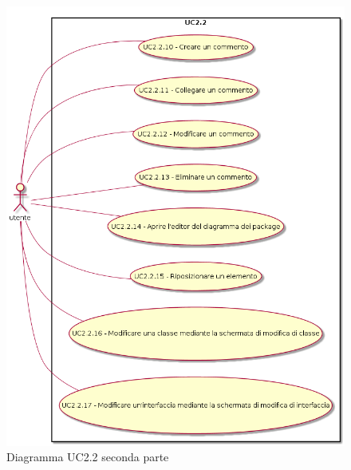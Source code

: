 \documentclass[../AnalisiDeiRequisiti.tex]{subfiles}
\begin{document}
	\begin{figure} [H]
		\centering
		\includegraphics[scale=0.45]{./Figures/UC2.2b.png}
		\caption{Diagramma UC2.2 seconda parte}\label{}
	\end{figure}
\end{document}
